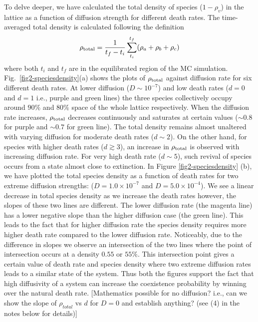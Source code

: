 \documentclass[aps, pre, twocolumn, amsmath, superscriptaddress,showkeys,showpacs]{revtex4-1}
\def\be{\begin{equation}}
\def\ee{\end{equation}}
\begin{document}
\par To delve deeper, we have calculated the {\color{red}total density of species ($1 - \rho_v$)} in the lattice as a function of diffusion strength for different death rates. {\color{red}The time-averaged total density is calculated following the definition
\be \rho_{\rm total} = \dfrac{1}{t_f - t_i}\sum\limits_{t_i}^{t_f} (\rho_a + \rho_b + \rho_c)\ee
where both $t_i$ and $t_f$ are in the equilibrated region of the MC simulation. Fig.\ \ref{fig2-speciesdensity}(a) shows the plots of $\rho_{\rm total}$ against diffusion rate for six different death rates.} At lower diffusion ($D\sim 10^{-7}$) and low death rates ($d=0$ and $d=1$ i.e., purple and green lines) {\color{red}the three species collectively occupy around $90\%$ and $80\%$ space of the whole lattice respectively. When the diffusion rate increases, $\rho_{\rm total}$ decreases continuously and saturates at certain values ($\sim 0.8$ for purple and $\sim 0.7$ for green line). The total density remains almost unaltered with varying diffusion for moderate death rates ($d\sim 2$). On the other hand, for species with higher death rates ($d\gtrsim 3$), an increase in $\rho_{\rm total}$ is observed with increasing diffusion rate. For very high death rate ($d\sim 5$), such revival of species occurs from a state almost close to extinction.} 
In Figure  \ref{fig2-speciesdensity} (b), we have plotted the total species density as a function of  death rates for two extreme diffusion strengths: ($D=1.0\times10^{-7}$ and $D=5.0\times10^{-4}$). We see a linear decrease in total species density as we increase the death rates however, the slopes of these two lines are different. The lower diffusion rate (the magenta line) has a lower negative slope than the higher diffusion case (the green line). This leads to the fact that for higher diffusion rate the species density requires more higher death rate compared to the lower diffusion rate. Noticeably, due to the difference in slopes we observe an intersection of the two lines where the point of intersection occurs at a density $0.55$ or $55\%$. This intersection point gives a certain value of death rate and species density where two extreme diffusion rates leads to a similar state of the system. Thus both the figures support the fact that high diffusivity of a system can increase the coexistence probability by winning over the natural death rate. {\color{blue}[Mathematics possible for no diffusion? i.e., can we show the slope of $\rho_{total}$ vs $d$ for $D=0$ and establish anything? (see (4) in the notes below for details)]}
\end{document}

